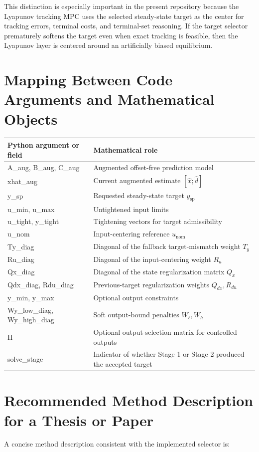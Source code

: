 \documentclass[11pt]{article}
\newcommand{\ysp}{y_{\mathrm{sp}}}
\begin{document}
This distinction is especially important in the present repository because the
Lyapunov tracking MPC uses the selected steady-state target as the center for
tracking errors, terminal costs, and terminal-set reasoning. If the target
selector prematurely softens the target even when exact tracking is feasible,
then the Lyapunov layer is centered around an artificially biased equilibrium.

\section{Mapping Between Code Arguments and Mathematical Objects}
\begin{center}
\begin{tabular}{>{\ttfamily}p{} p{}}
\toprule
Python argument or field & Mathematical role \\
\midrule
A\_aug, B\_aug, C\_aug & Augmented offset-free prediction model \\
xhat\_aug & Current augmented estimate $[\hat x;\hat d]$ \\
y\_sp & Requested steady-state target $\ysp$ \\
u\_min, u\_max & Untightened input limits \\
u\_tight, y\_tight & Tightening vectors for target admissibility \\
u\_nom & Input-centering reference $u_{\mathrm{nom}}$ \\
Ty\_diag & Diagonal of the fallback target-mismatch weight $T_y$ \\
Ru\_diag & Diagonal of the input-centering weight $R_u$ \\
Qx\_diag & Diagonal of the state regularization matrix $Q_x$ \\
Qdx\_diag, Rdu\_diag & Previous-target regularization weights $Q_{dx}, R_{du}$ \\
y\_min, y\_max & Optional output constraints \\
Wy\_low\_diag, Wy\_high\_diag & Soft output-bound penalties $W_{\ell}, W_h$ \\
H & Optional output-selection matrix for controlled outputs \\
solve\_stage & Indicator of whether Stage 1 or Stage 2 produced the accepted target \\
\bottomrule
\end{tabular}
\end{center}

\section{Recommended Method Description for a Thesis or Paper}
A concise method description consistent with the implemented selector is:
\end{document}

